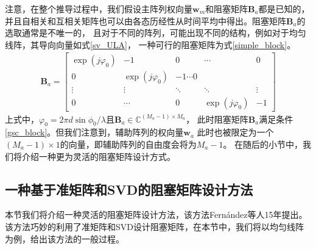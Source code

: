 \documentclass[master]{thesis-uestc}
\begin{document}
注意，在整个推导过程中，我们假设主阵列权向量$\bm{w}_m$和阻塞矩阵$\bm{B}_a$都是已知的，
并且自相关和互相关矩阵也可以由各态历经性从时间平均中得出。阻塞矩阵$\bm{B}_a$的选取通常是不唯一的，
且对于不同的阵列，可能出现不同的结构，例如对于均匀线阵，其导向向量如式\eqref{sv_ULA}，
一种可行的阻塞矩阵为式\eqref{simple_block}。
\begin{equation}\label{simple_block}
    \begin{aligned}
        \bm{B}_a = \begin{bmatrix}
                    \exp(j\varphi_0) & -1 & 0 & \cdots & 0 \\
                    0 & \exp(j\varphi_0) & -1 \cdots 0 \\
                    \vdots & \vdots & \ddots & \ddots & \vdots \\
                    0 & \cdots & 0 & \exp(j\varphi_0) & -1
                   \end{bmatrix}
    \end{aligned}
\end{equation}
上式中，$\varphi_0=2\pi d\sin\phi_0/\lambda$且$\bm{B}_a\in\mathbb{C}^{(M_a-1)\times M_a}$，
此时阻塞矩阵$\bm{B}_a$满足条件\eqref{gsc_block}。但我们注意到，辅助阵列的权向量$\bm{w}_a$
此时也被限定为一个$(M_a-1)\times1$的向量，即辅助阵列的自由度会将为$M_a-1$。
在随后的小节中，我们将介绍一种更为灵活的阻塞矩阵设计方式。

\subsection{一种基于准矩阵和SVD的阻塞矩阵设计方法}
本节我们将介绍一种灵活的阻塞矩阵设计方法，该方法Fernández等人15年提出\cite{Fernández}。
该方法巧妙的利用了准矩阵和SVD设计阻塞矩阵，在本节中，我们将以均匀线阵为例，给出该方法的一般过程。
\end{document}
